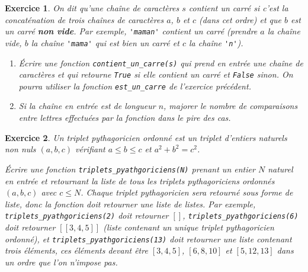 \documentclass[11pt,a4paper]{article}
\newtheorem{ex}{Exercice}
\begin{document}
\begin{ex}\label{contient_un_carre}
On dit qu'une chaîne de caractères $s$ contient un carré si c'est la concaténation de trois chaînes de caractères $a$, $b$ et $c$ (dans cet ordre) et que $b$ est un carré \textbf{non vide}.
Par exemple, \verb+'maman'+ contient un carré (prendre $a$ la chaîne vide, $b$ la chaîne \verb+'mama'+ qui est bien un carré et $c$ la chaîne \verb+'n'+). 
\begin{enumerate}
\item Écrire une fonction \verb+contient_un_carre(s)+ qui prend en entrée une chaîne de caractères et qui retourne \verb+True+ si elle contient un carré et \verb+False+ sinon. On pourra utiliser la fonction \verb+est_un_carre+ de l'exercice précédent.
\item Si la chaîne en entrée est de longueur $n$, majorer le nombre de comparaisons entre lettres effectuées par la fonction dans le pire des cas.
\end{enumerate}
\end{ex}



\begin{ex}\label{pythagore}
Un triplet pythagoricien ordonné est un triplet d'entiers naturels non nuls $(a,b,c)$ vérifiant $a\leq b \leq c$ et $a^2+b^2 = c^2$.

Écrire une fonction \verb+triplets_pyathgoriciens(N)+ prenant un entier $N$ naturel en entrée et retournant la liste de tous les triplets pythagoriciens ordonnés $(a,b,c)$ avec $c\leq N$. Chaque triplet pythagoricien sera retourné sous forme de liste, donc la fonction doit retourner une liste de listes. Par exemple, \verb+triplets_pyathgoriciens(2)+ doit retourner $[]$, \verb+triplets_pyathgoriciens(6)+ doit retourner $[[3,4,5]]$ (liste contenant un unique triplet pythagoricien ordonné), et 
\verb+triplets_pyathgoriciens(13)+ doit retourner une liste contenant trois éléments, ces éléments devant être $[3,4,5]$, $[6,8,10]$ et $[5,12,13]$ dans un ordre que l'on n'impose pas.
\end{ex}
\end{document}
